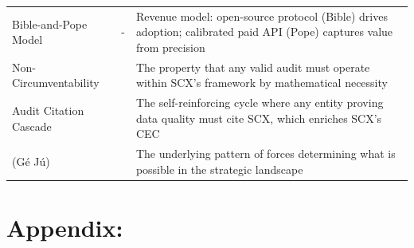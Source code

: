 \documentclass[12pt,a4paper]{article}
\theoremstyle{remark}
\begin{document}
{\begin{longtable}{@{}p{4cm} p{4cm} p{6cm}@{}}
\addlinespace
Bible-and-Pope Model & - & Revenue model: open-source protocol (Bible) drives adoption; calibrated paid API (Pope) captures value from precision \\
\addlinespace
Non-Circumventability & & The property that any valid audit must operate within SCX's framework by mathematical necessity \\
\addlinespace
Audit Citation Cascade & & The self-reinforcing cycle where any entity proving data quality must cite SCX, which enriches SCX's CEC \\
\addlinespace
 (Gé Jú) & & The underlying pattern of forces determining what is possible in the strategic landscape \\
\bottomrule
\end{longtable}
\newpage
\section{Appendix:}
}
\end{document}

